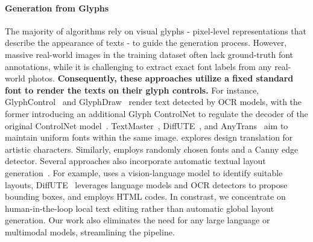\paragraph{Generation from Glyphs} The majority of algorithms rely on visual glyphs - pixel-level representations that describe the appearance of texts - to guide the generation process.
However, massive real-world images in the training dataset often lack ground-truth font annotations, while it is challenging to extract exact font labels from any real-world photos. \textbf{Consequently, these approaches utilize a fixed standard font to render the texts on their glyph controls.} For instance, GlyphControl~\cite{yang2024glyphcontrol} and GlyphDraw~\cite{ma2023glyphdraw} render text detected by OCR models, with the former introducing an additional Glyph ControlNet to regulate the decoder of the original ControlNet model~\cite{zhang2023adding}. TextMaster~\cite{wang2024textmaster}, DiffUTE~\cite{chen2024diffute}, and AnyTrans~\cite{qian2024anytrans} aim
to maintain uniform fonts within the same image. \citet{choi2024towards} explores design translation for artistic characters.
Similarly,
\citet{zhang2024brush} employs randomly chosen fonts and a Canny edge detector. Several approaches also incorporate automatic textual layout generation~\cite{tuo2023anytext, zhu2024visual, chen2024diffute, li2024first, seol2025posterllama, lakhanpal2024refining, paliwal2024orientext, zhao2024ltos}. For example, \cite{zhu2024visual} uses a vision-language model to identify suitable layouts, DiffUTE~\cite{chen2024diffute} leverages language models and OCR detectors to propose bounding boxes, and \cite{seol2025posterllama} employs HTML codes. 
In constrast, we concentrate on human-in-the-loop local text editing  rather than automatic global layout generation. Our work also eliminates the need for any large language or multimodal models, streamlining the pipeline.

